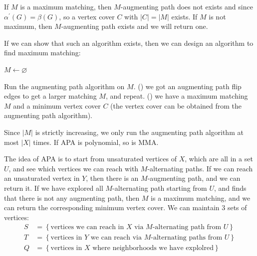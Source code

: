 \begin{remark}
    If \(M\) is a maximum matching, then \(M\)-augmenting path does not exists and since \(\alpha ^{\prime} (G) = \beta (G)\), so a vertex cover \(C\) with \(\vert C \vert = \vert M \vert  \) exists. If \(M\) is not maximum, then \(M\)-augmenting path exists and we will return one.       
\end{remark}

If we can show that such an algorithm exists, then we can design an algorithm to find maximum matching:

\begin{algorithm}[H]
    \caption{Maximum Matching Algorithm (MMA)}

    \(M \gets \varnothing\) 

    Run the augmenting path algorithm on \(M\).
    \If() {we got an augmenting path} {
        flip edges to get a larger matching \(M\), and repeat. 
    } \Else() {
        we have a maximum matching \(M\) and a minimum vertex cover \(C\) (the vertex cover can be obtained from the augmenting path algorithm).  
    }
\end{algorithm}

\begin{observation}
    Since \(\vert M \vert \) is strictly increasing, we only run the augmenting path algorithm at most \(\vert X \vert \) times. If APA is polynomial, so is MMA. 
\end{observation}


The idea of APA is to start from unsaturated vertices of \(X\), which are all in a set \(U\), and see which vertices we can reach with \(M\)-alternating paths. If we can reach an unsaturated vertex in \(Y\), then there is an \(M\)-augmenting path, and we can return it. If we have explored all \(M\)-alternating path starting from \(U\), and finds that there is not any augmenting path, then \(M\) is a maximum matching, and we can return the corresponding minimum vertex cover. We can maintain 3 sets of vertices:
\begin{align*}
    S &= \left\{ \text{vertices we can reach in } X \text{ via } M \text{-alternating path from } U    \right\} \\
    T &= \left\{ \text{vertices in } Y \text{ we can reach via } M\text{-alternating paths from } U    \right\} \\
    Q &= \left\{ \text{vertices in } X \text{ where neighborhoods we have explolred}   \right\}  
\end{align*}

